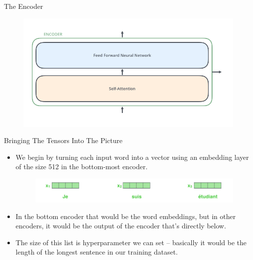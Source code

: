 \documentclass[handout]{beamer}
\begin{document}
\begin{frame}{The Encoder}



     \begin{figure}[h]
        	\includegraphics[scale = 0.35]{pics/Transformer_encoder.png}
        \end{figure}  





\end{frame}


\begin{frame}{Bringing The Tensors Into The Picture}
\begin{scriptsize}
\begin{itemize}



\item We begin by turning each input word into a vector using an embedding layer  of the size 512 in the bottom-most encoder.

\begin{figure}[h]
        	\includegraphics[scale = 0.35]{pics/embeddings_enc.png}
        \end{figure}  




\item In the bottom encoder that would be the word embeddings, but in other encoders, it would be the output of the encoder that's directly below.

\item The size of this list is hyperparameter we can set – basically it would be the length of the longest sentence in our training dataset.


\end{itemize}

\end{scriptsize}

    

\end{frame}
\end{document}
